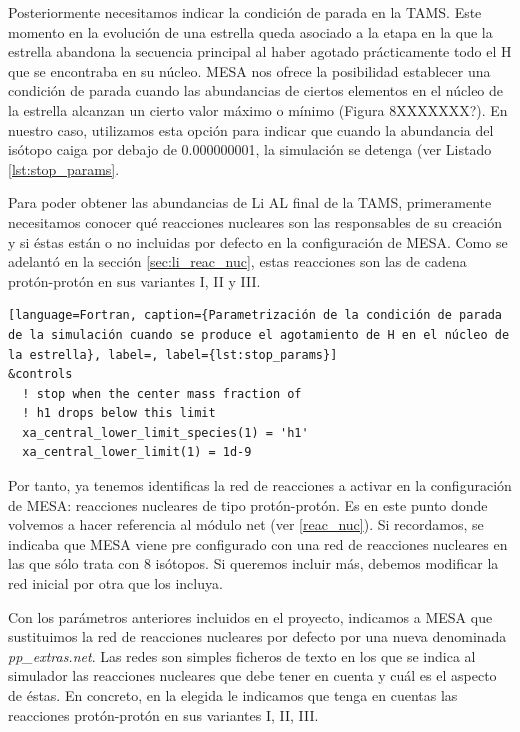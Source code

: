 Posteriormente necesitamos indicar la condición de parada en la TAMS. Este momento en la evolución de una estrella queda asociado a la etapa en la que la estrella abandona la secuencia principal al haber agotado prácticamente todo el H que se encontraba en su núcleo. MESA nos ofrece la posibilidad establecer una condición de parada cuando las abundancias de ciertos elementos en el núcleo de la estrella alcanzan un cierto valor máximo o mínimo (Figura 8XXXXXXX?). En nuestro caso, utilizamos esta opción para indicar que cuando la abundancia del isótopo  caiga por debajo de 0.000000001, la simulación se detenga (ver Listado \ref{lst:stop_params}.\par

Para poder obtener las abundancias de Li AL final de la TAMS, primeramente necesitamos conocer qué reacciones nucleares son las responsables de su creación y si éstas están o no incluidas por defecto en la configuración de MESA. Como se adelantó en la sección \ref{sec:li_reac_nuc}, estas reacciones son las de cadena protón-protón en sus variantes I, II y III.\par

\begin{lstlisting}[language=Fortran, caption={Parametrización de la condición de parada de la simulación cuando se produce el agotamiento de H en el núcleo de la estrella}, label=, label={lst:stop_params}]
&controls
  ! stop when the center mass fraction of 
  ! h1 drops below this limit
  xa_central_lower_limit_species(1) = 'h1'
  xa_central_lower_limit(1) = 1d-9
\end{lstlisting}


Por tanto, ya tenemos identificas la red de reacciones a activar en la configuración de MESA: reacciones nucleares de tipo protón-protón. Es en este punto donde volvemos a hacer referencia al módulo net (ver \ref{reac_nuc}). Si recordamos, se indicaba que MESA viene pre configurado con una red de reacciones nucleares en las que sólo trata con 8 isótopos. Si queremos incluir más, debemos modificar la red inicial por otra que los incluya.\par

Con los parámetros anteriores incluidos en el proyecto, indicamos a MESA que sustituimos la red de reacciones nucleares por defecto por una nueva denominada \textit{pp\_extras.net}. Las redes son simples ficheros de texto en los que se indica al simulador las reacciones nucleares que debe tener en cuenta y cuál es el aspecto de éstas. En concreto, en la elegida le indicamos que tenga en cuentas las reacciones protón-protón en sus variantes I, II, III.\par

